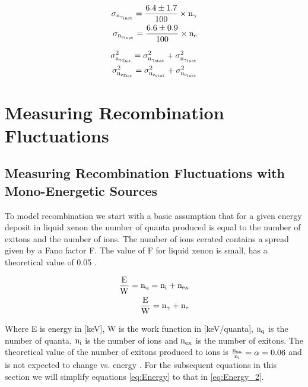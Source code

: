\begin{equation}
\begin{split}
\rm  \sigma_{n_{\gamma_{inst}}} = \frac{6.4\pm 1.7}{100} \times n_\gamma\\
\rm  \sigma_{n_{e_{inst}}} = \frac{6.6\pm 0.9}{100} \times n_e
\label{eq:SigInst}
\end{split}
\end{equation}

\begin{equation}
\begin{split}
\rm  \sigma_{n_{\gamma_{Det}}}^2 = \sigma_{n_{\gamma_{stat}}}^2 + \sigma_{n_{\gamma_{inst}}}^2 \\
\rm \sigma_{n_{e_{Det}}}^2 = \sigma_{n_{e_{stat}}}^2 + \sigma_{n_{e_{inst}}}^2
\label{eq:SigDet}
\end{split}
\end{equation}



\section{Measuring Recombination Fluctuations}

\subsection{Measuring Recombination Fluctuations with Mono-Energetic Sources}
\label{sec:flucs_mono}

To model recombination we start with a basic assumption that for a given energy deposit in liquid xenon the number of quanta produced is equal to the number of exitons and the number of ions. The number of ions cerated contains a spread given by a Fano factor F. The value of F for liquid xenon is small, has a theoretical value of 0.05 \cite{FanoTheoretical}.

\begin{equation}
\begin{split}
\rm  \frac{E}{W} = n_q = n_i + n_{ex}\\
\rm \frac{E}{W} = n_\gamma + n_e
\label{eq:Energy}
\end{split}
\end{equation}

Where E is energy in [keV], W is the work function in [keV/quanta], $\rm n_{q}$ is the number of quanta, $\rm n_{i}$ is the number of ions and $\rm n_{ex}$ is the number of exitons. The theoretical value of the number of exitons produced to ions is $\rm \frac{n_{ex}}{n_{i}}= \alpha = 0.06$ and is not expected to change vs. energy \cite{alpha_argon} \cite{alpha_xenon} \cite{Dahl_Thesis}. For the subsequent equations in this section we will simplify equations \ref{eq:Energy} to that in \ref{eq:Energy_2}.

